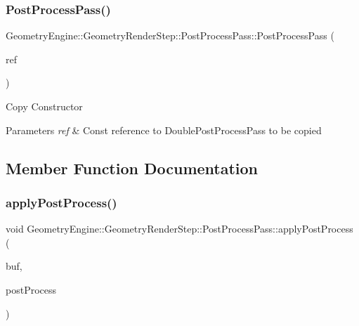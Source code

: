 \subsubsection{\texorpdfstring{PostProcessPass()}{PostProcessPass()}}
{\footnotesize\ttfamily Geometry\+Engine\+::\+Geometry\+Render\+Step\+::\+Post\+Process\+Pass\+::\+Post\+Process\+Pass (\begin{DoxyParamCaption}\item[{const \mbox{\hyperlink{class_geometry_engine_1_1_geometry_render_step_1_1_post_process_pass}{Post\+Process\+Pass}} \&}]{ref }\end{DoxyParamCaption})\hspace{0.3cm}{\ttfamily [inline]}}

Copy Constructor 
\begin{DoxyParams}{Parameters}
{\em ref} & Const reference to Double\+Post\+Process\+Pass to be copied \\
\hline
\end{DoxyParams}


\subsection{Member Function Documentation}
\mbox{\label{class_geometry_engine_1_1_geometry_render_step_1_1_post_process_pass_ac0f109e5dc7fb598c2613daaff285526}} 
\subsubsection{\texorpdfstring{applyPostProcess()}{applyPostProcess()}}
{\footnotesize\ttfamily void Geometry\+Engine\+::\+Geometry\+Render\+Step\+::\+Post\+Process\+Pass\+::apply\+Post\+Process (\begin{DoxyParamCaption}\item[{\mbox{\hyperlink{class_geometry_engine_1_1_geometry_buffer_1_1_g_buffer}{Geometry\+Buffer\+::\+G\+Buffer}} $\ast$}]{buf,  }\item[{const std\+::list$<$ \mbox{\hyperlink{class_geometry_engine_1_1_geometry_post_process_1_1_post_process}{Geometry\+Post\+Process\+::\+Post\+Process}} $\ast$ $>$ \&}]{post\+Process }\end{DoxyParamCaption})\hspace{0.3cm}{\ttfamily [protected]}}

